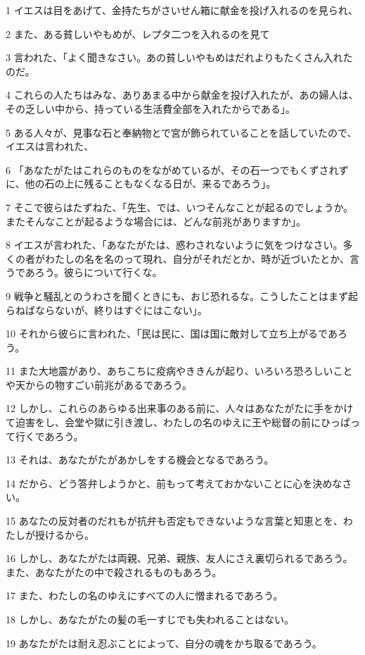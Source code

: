 \par 1 イエスは目をあげて、金持たちがさいせん箱に献金を投げ入れるのを見られ、
\par 2 また、ある貧しいやもめが、レプタ二つを入れるのを見て
\par 3 言われた、「よく聞きなさい。あの貧しいやもめはだれよりもたくさん入れたのだ。
\par 4 これらの人たちはみな、ありあまる中から献金を投げ入れたが、あの婦人は、その乏しい中から、持っている生活費全部を入れたからである」。
\par 5 ある人々が、見事な石と奉納物とで宮が飾られていることを話していたので、イエスは言われた、
\par 6 「あなたがたはこれらのものをながめているが、その石一つでもくずされずに、他の石の上に残ることもなくなる日が、来るであろう」。
\par 7 そこで彼らはたずねた、「先生、では、いつそんなことが起るのでしょうか。またそんなことが起るような場合には、どんな前兆がありますか」。
\par 8 イエスが言われた、「あなたがたは、惑わされないように気をつけなさい。多くの者がわたしの名を名のって現れ、自分がそれだとか、時が近づいたとか、言うであろう。彼らについて行くな。
\par 9 戦争と騒乱とのうわさを聞くときにも、おじ恐れるな。こうしたことはまず起らねばならないが、終りはすぐにはこない」。
\par 10 それから彼らに言われた、「民は民に、国は国に敵対して立ち上がるであろう。
\par 11 また大地震があり、あちこちに疫病やききんが起り、いろいろ恐ろしいことや天からの物すごい前兆があるであろう。
\par 12 しかし、これらのあらゆる出来事のある前に、人々はあなたがたに手をかけて迫害をし、会堂や獄に引き渡し、わたしの名のゆえに王や総督の前にひっぱって行くであろう。
\par 13 それは、あなたがたがあかしをする機会となるであろう。
\par 14 だから、どう答弁しようかと、前もって考えておかないことに心を決めなさい。
\par 15 あなたの反対者のだれもが抗弁も否定もできないような言葉と知恵とを、わたしが授けるから。
\par 16 しかし、あなたがたは両親、兄弟、親族、友人にさえ裏切られるであろう。また、あなたがたの中で殺されるものもあろう。
\par 17 また、わたしの名のゆえにすべての人に憎まれるであろう。
\par 18 しかし、あなたがたの髪の毛一すじでも失われることはない。
\par 19 あなたがたは耐え忍ぶことによって、自分の魂をかち取るであろう。
